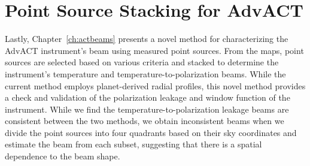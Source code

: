 \section{Point Source Stacking for AdvACT}
Lastly, Chapter~\ref{ch:actbeams} presents a novel method for characterizing the AdvACT instrument's beam using measured point sources.  From the maps, point sources are selected based on various criteria and stacked to determine the instrument's temperature and temperature-to-polarization beams.  While the current method employs planet-derived radial profiles, this novel method provides a check and validation of the polarization leakage and window function of the instrument.  While we find the temperature-to-polarization leakage beams are consistent between the two methods, we obtain inconsistent beams when we divide the point sources into four quadrants based on their sky coordinates and estimate the beam from each subset, suggesting that there is a spatial dependence to the beam shape.